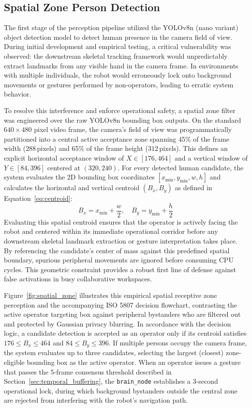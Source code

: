\subsection{Spatial Zone Person Detection}
The first stage of the perception pipeline utilized the YOLOv8n (nano variant) object detection model \cite{yolov8_ultralytics} to detect human presence in the camera field of view. During initial development and empirical testing, a critical vulnerability was observed: the downstream skeletal tracking framework would unpredictably extract landmarks from any visible hand in the camera frame. In environments with multiple individuals, the robot would erroneously lock onto background movements or gestures performed by non-operators, leading to erratic system behavior.

To resolve this interference and enforce operational safety, a spatial zone filter was engineered over the raw YOLOv8n bounding box outputs. On the standard $640 \times 480$ pixel video frame, the camera's field of view was programmatically partitioned into a central active acceptance zone spanning 45\% of the frame width ($288\,\text{pixels}$) and 65\% of the frame height ($312\,\text{pixels}$). This defines an explicit horizontal acceptance window of $X \in [176, 464]$ and a vertical window of $Y \in [84, 396]$ centered at $(320, 240)$. For every detected human candidate, the system evaluates the 2D bounding box coordinates $[x_{\min}, y_{\min}, w, h]$ and calculates the horizontal and vertical centroid $(B_x, B_y)$ as defined in Equation~\eqref{eq:centroid}:
\begin{equation}
\label{eq:centroid}
B_x = x_{\min} + \frac{w}{2}, \quad B_y = y_{\min} + \frac{h}{2}
\end{equation}
Evaluating this spatial centroid ensures that the operator is actively facing the robot and centered within its immediate operational corridor before any downstream skeletal landmark extraction or gesture interpretation takes place. By referencing the candidate's center of mass against this predefined spatial boundary, spurious peripheral movements are ignored before consuming CPU cycles. This geometric constraint provides a robust first line of defense against false activations in busy collaborative workspaces.

Figure~\ref{fig:spatial_zone} illustrates this empirical spatial receptive zone perception and the accompanying ISO 5807 decision flowchart, contrasting the active operator targeting box against peripheral bystanders who are filtered out and protected by Gaussian privacy blurring. In accordance with the decision logic, a candidate detection is accepted as an operator only if its centroid satisfies $176 \le B_x \le 464$ and $84 \le B_y \le 396$. If multiple persons occupy the camera frame, the system evaluates up to three candidates, selecting the largest (closest) zone-eligible bounding box as the active operator. When an operator issues a gesture that passes the 5-frame consensus threshold described in Section~\ref{sec:temporal_buffering}, the \texttt{brain\_node} establishes a 3-second operational lock, during which background bystanders outside the central zone are rejected from interfering with the robot's navigation path.

